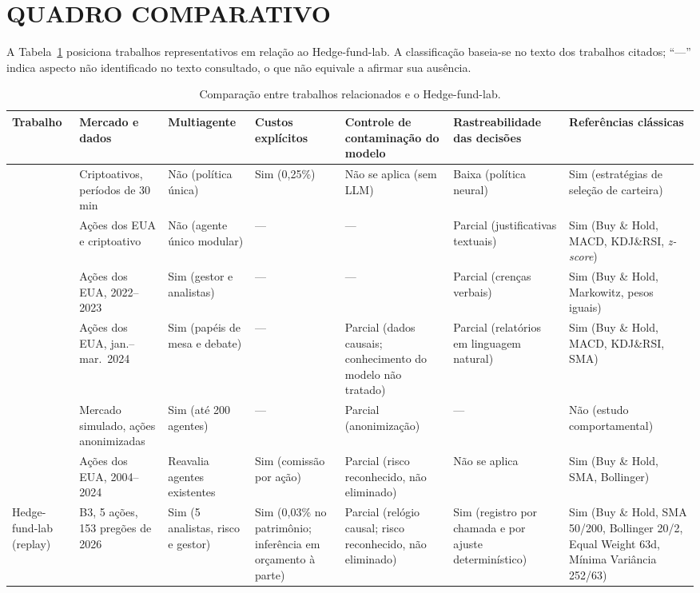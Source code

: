 \section{QUADRO COMPARATIVO}

A Tabela~\ref{tab:relacionados} posiciona trabalhos representativos em relação ao Hedge-fund-lab. A classificação baseia-se no texto dos trabalhos citados; ``---'' indica aspecto não identificado no texto consultado, o que não equivale a afirmar sua ausência.

\begin{table}[htbp]
\centering
\caption{Comparação entre trabalhos relacionados e o Hedge-fund-lab.}
\label{tab:relacionados}
\footnotesize
\setlength{\tabcolsep}{3pt}
\begin{tabular}{>{\raggedright\arraybackslash}p{1.9cm} >{\raggedright\arraybackslash}p{2.2cm} >{\raggedright\arraybackslash}p{1.8cm} >{\raggedright\arraybackslash}p{1.6cm} >{\raggedright\arraybackslash}p{2.4cm} >{\raggedright\arraybackslash}p{2.0cm} >{\raggedright\arraybackslash}p{2.4cm}}
\toprule
\textbf{Trabalho} & \textbf{Mercado e dados} & \textbf{Multi\-agente} & \textbf{Custos explícitos} & \textbf{Controle de contaminação do modelo} & \textbf{Rastrea\-bilidade das decisões} & \textbf{Referências clássicas} \\
\midrule
\citet{Jiang2017} & Criptoativos, períodos de 30 min & Não (política única) & Sim (0,25\%) & Não se aplica (sem LLM) & Baixa (política neural) & Sim (estratégias de seleção de carteira) \\
\addlinespace
\citet{FinAgent2024} & Ações dos EUA e criptoativo & Não (agente único modular) & --- & --- & Parcial (justificativas textuais) & Sim (Buy \& Hold, MACD, KDJ\&RSI, \textit{z-score}) \\
\addlinespace
\citet{FinCon2024} & Ações dos EUA, 2022--2023 & Sim (gestor e analistas) & --- & --- & Parcial (crenças verbais) & Sim (Buy \& Hold, Markowitz, pesos iguais) \\
\addlinespace
\citet{TradingAgents2024} & Ações dos EUA, jan.--mar.\ 2024 & Sim (papéis de mesa e debate) & --- & Parcial (dados causais; conhecimento do modelo não tratado) & Parcial (relatórios em linguagem natural) & Sim (Buy \& Hold, MACD, KDJ\&RSI, SMA) \\
\addlinespace
\citet{StockAgent2024} & Mercado simulado, ações anonimizadas & Sim (até 200 agentes) & --- & Parcial (anonimização) & --- & Não (estudo comportamental) \\
\addlinespace
\citet{FINSABER2026} & Ações dos EUA, 2004--2024 & Reavalia agentes existentes & Sim (comissão por ação) & Parcial (risco reconhecido, não eliminado) & Não se aplica & Sim (Buy \& Hold, SMA, Bollinger) \\
\addlinespace
Hedge-fund-lab (replay) & B3, 5 ações, 153 pregões de 2026 & Sim (5 analistas, risco e gestor) & Sim (0,03\% no patrimônio; inferência em orçamento à parte) & Parcial (relógio causal; risco reconhecido, não eliminado) & Sim (registro por chamada e por ajuste determinístico) & Sim (Buy \& Hold, SMA 50/200, Bollinger 20/2, Equal Weight 63d, Mínima Variância 252/63) \\
\bottomrule
\end{tabular}


\end{table}
